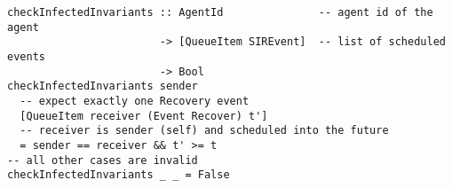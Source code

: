 \begin{footnotesize}
\begin{verbatim}
checkInfectedInvariants :: AgentId               -- agent id of the agent 
                        -> [QueueItem SIREvent]  -- list of scheduled events
                        -> Bool
checkInfectedInvariants sender 
  -- expect exactly one Recovery event
  [QueueItem receiver (Event Recover) t'] 
  -- receiver is sender (self) and scheduled into the future
  = sender == receiver && t' >= t 
-- all other cases are invalid
checkInfectedInvariants _ _ = False
\end{verbatim}
\end{footnotesize}

%
%

